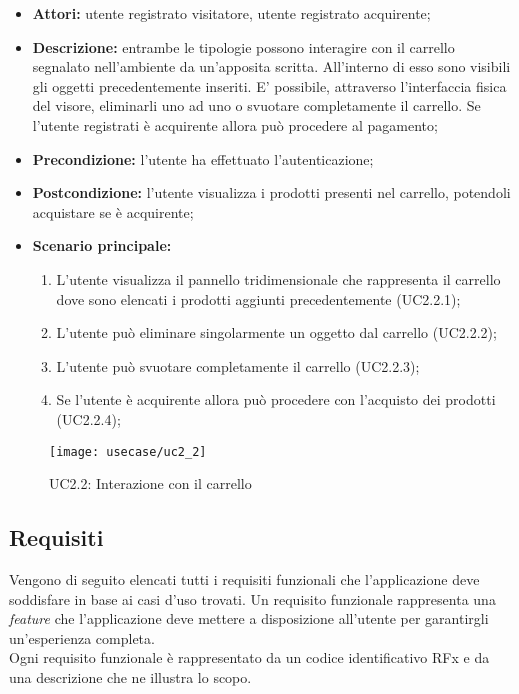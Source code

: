 \begin{itemize}
	\item \textbf{Attori:} utente registrato visitatore, utente registrato acquirente;
	\item \textbf{Descrizione:} entrambe le tipologie possono interagire con il carrello segnalato nell'ambiente da un'apposita scritta. All'interno di esso sono visibili gli oggetti precedentemente inseriti. E' possibile, attraverso l'interfaccia fisica del visore, eliminarli uno ad uno o svuotare completamente il carrello. Se l'utente registrati è acquirente allora può procedere al pagamento;
	\item \textbf{Precondizione:} l'utente ha effettuato l'autenticazione;
	\item \textbf{Postcondizione:} l'utente visualizza i prodotti presenti nel carrello, potendoli acquistare se è acquirente;
	\item \textbf{Scenario principale:}
	\begin{enumerate}
		\item L'utente visualizza il pannello tridimensionale che rappresenta il carrello dove sono elencati i prodotti aggiunti precedentemente (UC2.2.1);
		\item L'utente può eliminare singolarmente un oggetto dal carrello (UC2.2.2);
		\item L'utente può svuotare completamente il carrello (UC2.2.3);
		\item Se l'utente è acquirente allora può procedere con l'acquisto dei prodotti (UC2.2.4);
	\end{enumerate}
\end{itemize}

\label{UC2.2}
\begin{figure}[ht]
	\begin{center}
		\texttt{[image: usecase/uc2\_2]}
		\caption{UC2.2: Interazione con il carrello}
	\end{center}
\end{figure}
\FloatBarrier

\subsection{Requisiti}

Vengono di seguito elencati tutti i requisiti funzionali che l'applicazione deve soddisfare in base ai casi d'uso trovati. Un requisito funzionale rappresenta una \textit{feature} che l'applicazione deve mettere a disposizione all'utente per garantirgli un'esperienza completa. \\
Ogni requisito funzionale è rappresentato da un codice identificativo RFx e da una descrizione che ne illustra lo scopo.

